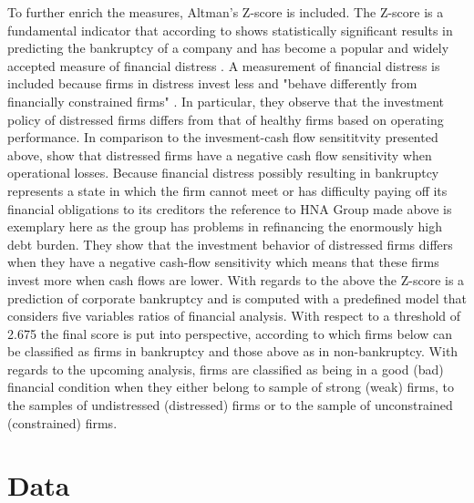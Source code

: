 \documentclass[12pt]{article}
\begin{document}
To further enrich the measures, Altman's Z-score is included. The Z-score is a fundamental indicator that according to \citet[p.5]{Mohr2012} shows statistically significant results in predicting the bankruptcy of a company and has become a popular and widely accepted measure of financial distress \citep[p.2903]{Campbell2008}. A measurement of financial distress is included because firms in distress invest less and "behave differently from financially constrained firms" \citep[p.461]{Bhagat2005}. In particular, they observe that the investment policy of distressed firms differs from that of healthy firms based on operating performance. In comparison to the invesment-cash flow sensititvity presented above, \citet{Bhagat2005} show that distressed firms have a negative cash flow sensitivity when operational losses.
	 Because financial distress possibly resulting in bankruptcy represents a state in which the firm cannot meet or has difficulty paying off its financial obligations to its creditors the reference to HNA Group made above is exemplary here as the group has problems in refinancing the enormously high debt burden. 
They show that the investment behavior of distressed firms differs when they have a negative cash-flow sensitivity which means that these firms invest more when cash flows are lower. With regards to the above the Z-score is a prediction of corporate bankruptcy \citep[p.594]{Altman} and is computed with a predefined model that considers five variables ratios of financial analysis. With respect to a threshold of 2.675 \citep[p.607]{Altman1968} the final score is put into perspective, according to which firms below can be classified as firms in bankruptcy and those above as in non-bankruptcy. 
With regards to the upcoming analysis, firms are classified as being in a good (bad) financial condition when they either belong to sample of strong (weak) firms, to the samples of undistressed (distressed) firms or to the sample of unconstrained (constrained) firms.

\section{Data}
\end{document}
